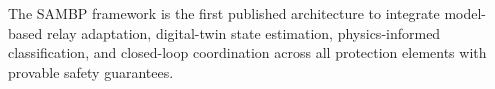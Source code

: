 \begin{doublespacing}
The SAMBP framework is the first published architecture to integrate model-based
relay adaptation, digital-twin state estimation, physics-informed classification,
and closed-loop coordination across all protection elements with provable safety
guarantees.

\end{doublespacing}
